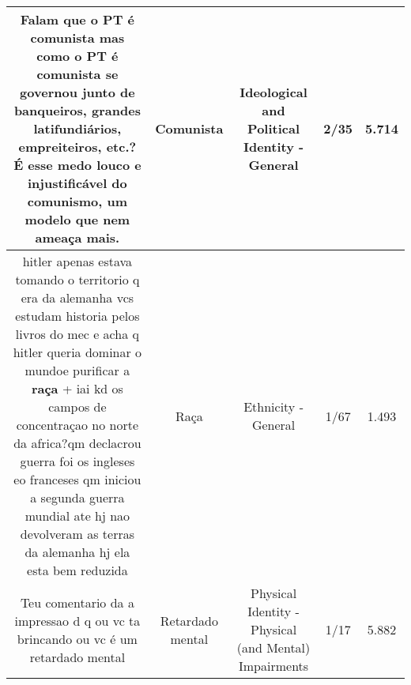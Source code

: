 \documentclass[11pt]{article}
\newlength\mylength
\begin{document}
\begin{center}
\begin{longtable}{|C{.65\mylength}|C{.30\mylength}|C{.12\mylength}|C{.12\mylength}|C{.12\mylength}|}
  \small Falam que o PT é \textbf{comunista} mas como o PT é \textbf{comunista} se governou junto de banqueiros, grandes latifundiários, empreiteiros, etc.? É esse medo louco e injustificável do comunismo, um modelo que nem ameaça mais.\normalsize   & Comunista & Ideological and Political Identity - General & 2/35 & 5.714 \\  \hline
  \small hitler apenas estava tomando o territorio q era da alemanha vcs estudam historia pelos livros do mec e  acha q hitler queria dominar o mundoe purificar a \textbf{raça} + iai kd os campos de concentraçao no norte da africa?qm declacrou guerra  foi os ingleses eo franceses  qm iniciou a segunda guerra mundial ate hj nao devolveram as terras da alemanha  hj ela esta bem reduzida\normalsize   & Raça & Ethnicity - General & 1/67 & 1.493 \\  \hline
  \small Teu comentario da a impressao d q ou vc ta brincando ou vc é um retardado mental\normalsize   & Retardado mental & Physical Identity - Physical (and Mental) Impairments & 1/17 & 5.882 \\  \hline

\end{longtable}
\end{center}
\end{document}
